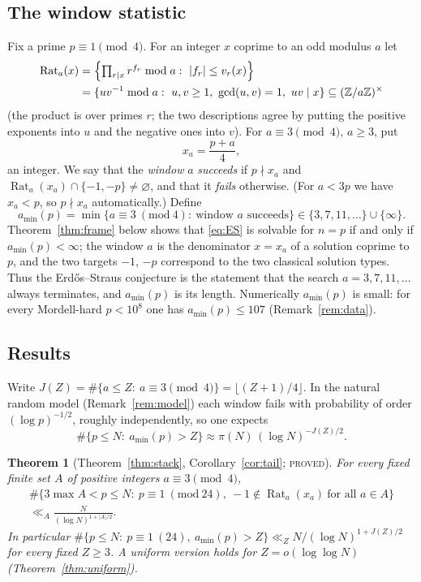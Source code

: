 \documentclass[11pt,reqno]{amsart}
\newtheorem{introthm}{Theorem}
\theoremstyle{definition}
\newcommand{\Z}{\mathbb Z}
\newcommand{\Rat}{\operatorname{Rat}}
\newcommand{\amin}{a_{\min}}
\newcommand{\status}[1]{\textup{\textsc{#1}}}
\begin{document}
\subsection{The window statistic}
Fix a prime $p\equiv1\pmod4$.  For an integer $x$ coprime to an odd modulus
$a$ let
\begin{align*}
 \Rat_a(x)&=\Bigl\{\textstyle\prod_{r\mid x}r^{f_r}\bmod a:\ |f_r|\le v_r(x)\Bigr\}\\
 &=\{u v^{-1}\bmod a:\ u,v\ge1,\ \gcd(u,v)=1,\ uv\mid x\}\subseteq(\Z/a\Z)^\times
\end{align*}
(the product is over primes $r$; the two descriptions agree by putting the
positive exponents into $u$ and the negative ones into $v$).  For
$a\equiv3\pmod4$, $a\ge3$, put
\[
 x_a=\frac{p+a}4,
\]
an integer.  We say that the \emph{window} $a$ \emph{succeeds} if
$p\nmid x_a$ and $\Rat_a(x_a)\cap\{-1,-p\}\ne\varnothing$, and that it
\emph{fails} otherwise.  (For $a<3p$ we have $x_a<p$, so $p\nmid x_a$
automatically.)  Define
\[
 \amin(p)=\min\{a\equiv3\ (\mathrm{mod}\ 4):\ \text{window $a$ succeeds}\}
 \in\{3,7,11,\dots\}\cup\{\infty\}.
\]
Theorem~\ref{thm:frame} below shows that \eqref{eq:ES} is solvable for
$n=p$ if and only if $\amin(p)<\infty$; the window $a$ is the denominator
$x=x_a$ of a solution coprime to $p$, and the two targets $-1$, $-p$
correspond to the two classical solution types.  Thus the
Erd\H{o}s--Straus conjecture is the statement that the search
$a=3,7,11,\dots$ always terminates, and $\amin(p)$ is its length.
Numerically $\amin(p)$ is small: for every Mordell-hard $p<10^8$ one has
$\amin(p)\le107$ (Remark~\ref{rem:data}).

\subsection{Results}
Write $J(Z)=\#\{a\le Z:\ a\equiv3\pmod4\}=\lfloor(Z+1)/4\rfloor$.
In the natural random model (Remark~\ref{rem:model}) each window fails
with probability of order $(\log p)^{-1/2}$, roughly independently, so
one expects
\begin{equation}\label{eq:model-intro}
 \#\{p\le N:\ \amin(p)>Z\}\approx \pi(N)\,(\log N)^{-J(Z)/2}.
\end{equation}

\begin{introthm}[Theorem~\ref{thm:stack}, Corollary~\ref{cor:tail}; \status{proved}]\label{thmA}
For every fixed finite set $A$ of positive integers $a\equiv3\pmod4$,
\begin{multline*}
 \#\{3\max A<p\le N:\ p\equiv1\ (\mathrm{mod}\ 24),\ -1\notin\Rat_a(x_a)\ \text{for all }a\in A\}\\
 \ll_A\frac N{(\log N)^{1+|A|/2}}.
\end{multline*}
In particular $\#\{p\le N:\ p\equiv1\ (24),\ \amin(p)>Z\}\ll_Z N/(\log N)^{1+J(Z)/2}$
for every fixed $Z\ge3$.  A uniform version holds for $Z=o(\log\log N)$
(Theorem~\ref{thm:uniform}).
\end{introthm}
\end{document}
